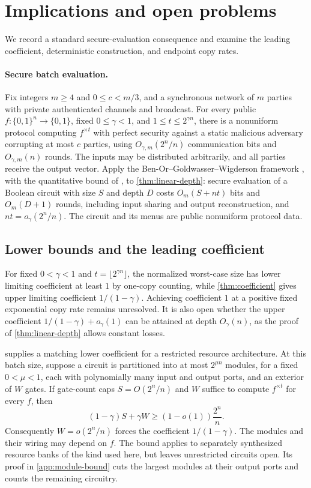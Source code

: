 \documentclass[11pt]{article}
\newcommand{\bits}{\{0,1\}}
\begin{document}
\section{Implications and open problems}\label{sec:discussion}

We record a standard secure-evaluation consequence and examine the leading
coefficient, deterministic construction, and endpoint copy rates.

\paragraph{Secure batch evaluation.}
Fix integers $m\ge4$ and $0\le c<m/3$, and a synchronous network of $m$
parties with private authenticated channels and broadcast.
For every public $f:\bits^n\to\bits$,
fixed $0\le\gamma<1$, and $1\le t\le2^{\gamma n}$, there is a nonuniform
protocol computing $f^{\times t}$ with perfect security against a static
malicious adversary corrupting at most $c$ parties, using
$O_{\gamma,m}(2^n/n)$ communication bits and $O_{\gamma,m}(n)$ rounds.
The inputs may be distributed arbitrarily, and all parties receive the
output vector.  Apply the Ben-Or--Goldwasser--Wigderson framework
\cite{BenOrGoldwasserWigderson1988}, with the quantitative bound of
\cite[Theorem~1.2 of the full version]{AbrahamAsharovYanai2021}, to
\cref{thm:linear-depth}: secure evaluation of a Boolean circuit with size
$S$ and depth $D$ costs $O_m(S+nt)$ bits and $O_m(D+1)$ rounds, including
input sharing and output reconstruction, and $nt=o_\gamma(2^n/n)$.
The circuit and its menus are public nonuniform protocol data.

\subsection{Lower bounds and the leading coefficient}\label{sec:lower-bounds}

For fixed $0<\gamma<1$ and $t=\lfloor2^{\gamma n}\rfloor$, the normalized
worst-case size has lower limiting coefficient at least $1$ by one-copy
counting, while \cref{thm:coefficient} gives upper limiting coefficient
$1/(1-\gamma)$.  Achieving coefficient $1$ at a positive fixed exponential
copy rate remains unresolved.  It is also open whether the upper
coefficient $1/(1-\gamma)+o_\gamma(1)$ can be attained at depth
$O_\gamma(n)$, as the proof of \cref{thm:linear-depth} allows constant losses.

 supplies a matching lower coefficient for a
restricted resource architecture.  At this batch size, suppose a circuit
is partitioned into at most $2^{\mu n}$ modules, for a fixed $0<\mu<1$,
each with polynomially many input and output ports, and an exterior of
$W$ gates.  If gate-count caps $S=O(2^n/n)$ and $W$ suffice to compute
$f^{\times t}$ for every
$f$, then
\[
 (1-\gamma)S+\gamma W\ge(1-o(1))\frac{2^n}{n}.
\]
Consequently $W=o(2^n/n)$ forces the coefficient $1/(1-\gamma)$.
The modules and their wiring may depend on $f$.  The bound applies to
separately synthesized resource banks of the kind used here, but leaves
unrestricted circuits open.  Its proof in \cref{app:module-bound} cuts the
largest modules at their output ports and counts the remaining circuitry.
\end{document}
